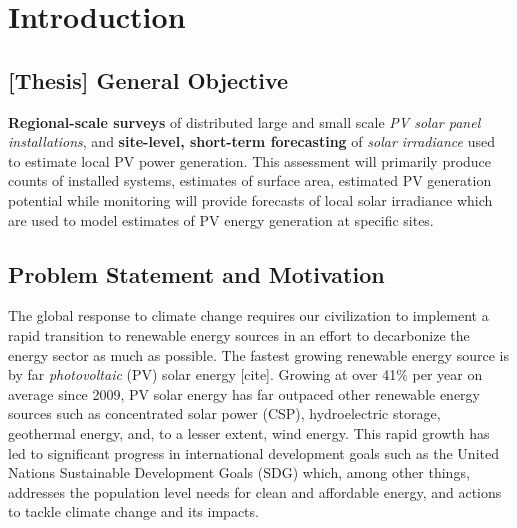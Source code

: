 \section{Introduction}



\subsection{[Thesis] General Objective}
    \textbf{Regional-scale surveys} of distributed large and small scale \textit{PV solar panel installations}, and \textbf{site-level, short-term forecasting} of \textit{solar irradiance} used to estimate local PV power generation.
    This assessment will primarily produce counts of installed systems, estimates of surface area, estimated PV generation potential while monitoring will provide forecasts of local solar irradiance which are used to model estimates of PV energy generation at specific sites.

\subsection{Problem Statement and Motivation} 
The global response to climate change requires our civilization to implement a rapid transition to renewable energy sources in an effort to 
decarbonize the energy sector as much as possible. The fastest growing renewable energy source is by far \textit{photovoltaic} (PV) solar energy [cite]. Growing at over 41\% per year on average since 2009\cite{kruitwagen_global_inventory_pv_units_2021},
PV solar energy has far outpaced other renewable energy sources such as concentrated solar power (CSP), hydroelectric storage, geothermal energy, and, to a lesser extent, wind energy. 
This rapid growth has led to significant progress in international development goals such as the United Nations Sustainable Development Goals (SDG) which, among other things, 
addresses the population level needs for clean and affordable energy, and actions to tackle climate change and its impacts\cite{maxar_germany_pv_dataset}. 

